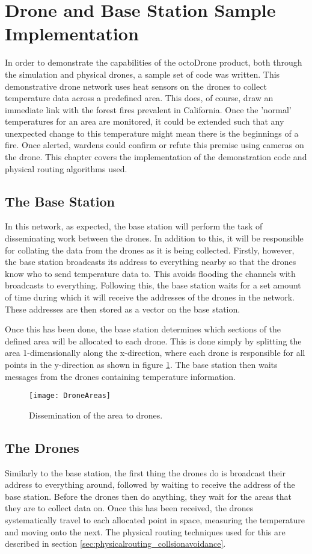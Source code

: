 \section{Drone and Base Station Sample Implementation}
In order to demonstrate the capabilities of the octoDrone product, both through the simulation and physical drones, a sample set of code was written. This demonstrative drone network uses heat sensors on the drones to collect temperature data across a predefined area. This does, of course, draw an immediate link with the forest fires prevalent in California. Once the 'normal' temperatures for an area are monitored, it could be extended such that any unexpected change to this temperature might mean there is the beginnings of a fire. Once alerted, wardens could confirm or refute this premise using cameras on the drone. This chapter covers the implementation of the demonstration code and physical routing algorithms used.

\subsection{The Base Station}
In this network, as expected, the base station will perform the task of disseminating work between the drones. In addition to this, it will be responsible for collating the data from the drones as it is being collected. Firstly, however, the base station broadcasts its address to everything nearby so that the drones know who to send temperature data to. This avoids flooding the channels with broadcasts to everything. Following this, the base station waits for a set amount of time during which it will receive the addresses of the drones in the network. These addresses are then stored as a vector on the base station.

Once this has been done, the base station determines which sections of the defined area will be allocated to each drone. This is done simply by splitting the area 1-dimensionally along the x-direction, where each drone is responsible for all points in the y-direction as shown in figure \ref{fig:area_dissemination}. The base station then waits messages from the drones containing temperature information.

\begin{figure}[h!]
\centering
\texttt{[image: DroneAreas]}
\caption{Dissemination of the area to drones.}
\label{fig:area_dissemination}
\end{figure}

\subsection{The Drones}
Similarly to the base station, the first thing the drones do is broadcast their address to everything around, followed by waiting to receive the address of the base station. Before the drones then do anything, they wait for the areas that they are to collect data on. Once this has been received, the drones systematically travel to each allocated point in space, measuring the temperature and moving onto the next. The physical routing techniques used for this are described in section \ref{sec:physicalrouting_collsionavoidance}.

